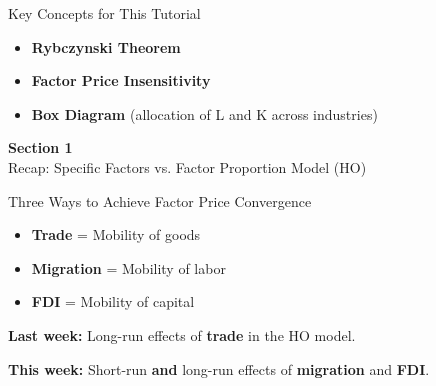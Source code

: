 \documentclass{beamer}
\begin{document}

\begin{frame}{Key Concepts for This Tutorial}

\begin{itemize}
    \item \textbf{Rybczynski Theorem}

    \vspace{0.3cm}

    \item \textbf{Factor Price Insensitivity}

    \vspace{0.3cm}

    \item \textbf{Box Diagram} (allocation of L and K across industries)

\end{itemize}

\end{frame}



\begin{frame}

\vspace{2cm}

\centering
{\LARGE \textbf{Section 1}} \\[0.5cm]
{\Large Recap: Specific Factors vs. Factor Proportion Model (HO)}

\vfill

\end{frame}


\begin{frame}{Three Ways to Achieve Factor Price Convergence}

\begin{itemize}
    \item \textbf{Trade} = Mobility of goods
    \item \textbf{Migration} = Mobility of labor
    \item \textbf{FDI} = Mobility of capital
\end{itemize}

\vspace{0.5cm}

\textbf{Last week:} Long-run effects of \textbf{trade} in the HO model.

\vspace{0.2cm}

\textbf{This week:} Short-run \textbf{and} long-run effects of \textbf{migration} and \textbf{FDI}.

\end{frame}
\end{document}
